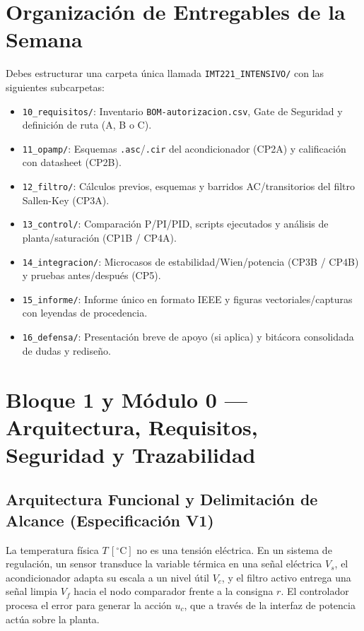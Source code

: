 \documentclass[11pt, a4paper]{article}
\begin{document}
\section*{Organización de Entregables de la Semana}
Debes estructurar una carpeta única llamada \texttt{IMT221\_INTENSIVO/} con las siguientes subcarpetas:
\begin{itemize}[noitemsep]
    \item \texttt{10\_requisitos/}: Inventario \texttt{BOM-autorizacion.csv}, Gate de Seguridad y definición de ruta (A, B o C).
    \item \texttt{11\_opamp/}: Esquemas \texttt{.asc}/\texttt{.cir} del acondicionador (CP2A) y calificación con datasheet (CP2B).
    \item \texttt{12\_filtro/}: Cálculos previos, esquemas y barridos AC/transitorios del filtro Sallen-Key (CP3A).
    \item \texttt{13\_control/}: Comparación P/PI/PID, scripts ejecutados y análisis de planta/saturación (CP1B / CP4A).
    \item \texttt{14\_integracion/}: Microcasos de estabilidad/Wien/potencia (CP3B / CP4B) y pruebas antes/después (CP5).
    \item \texttt{15\_informe/}: Informe único en formato IEEE y figuras vectoriales/capturas con leyendas de procedencia.
    \item \texttt{16\_defensa/}: Presentación breve de apoyo (si aplica) y bitácora consolidada de dudas y rediseño.
\end{itemize}

\newpage
\section{Bloque 1 y Módulo 0 — Arquitectura, Requisitos, Seguridad y Trazabilidad}

\subsection{Arquitectura Funcional y Delimitación de Alcance (Especificación V1)}
La temperatura física $T\,[^\circ\text{C}]$ no es una tensión eléctrica. En un sistema de regulación, un sensor transduce la variable térmica en una señal eléctrica $V_s$, el acondicionador adapta su escala a un nivel útil $V_c$, y el filtro activo entrega una señal limpia $V_f$ hacia el nodo comparador frente a la consigna $r$. El controlador procesa el error para generar la acción $u_c$, que a través de la interfaz de potencia actúa sobre la planta.
\end{document}
